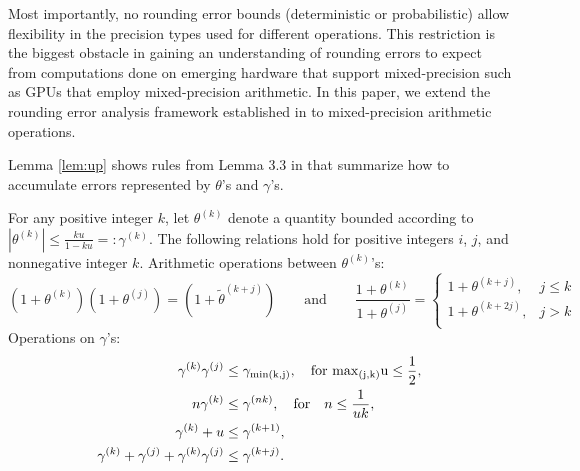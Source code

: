 \documentclass[review,onefignum,onetabnum]{siamart190516}
\newcommand{\tth}{\theta}
\begin{document}
Most importantly, no rounding error bounds (deterministic or probabilistic) allow flexibility in the precision types used for different operations. 
This restriction is the biggest obstacle in gaining an understanding of rounding errors to expect from computations done on emerging hardware that support mixed-precision such as GPUs that employ mixed-precision arithmetic.
In this paper, we extend the rounding error analysis framework established in \cite{Higham2002} to mixed-precision arithmetic operations. 




Lemma \ref{lem:up} shows rules from Lemma 3.3 in \cite{Higham2002} that summarize how to accumulate errors represented by $\tth$'s and $\gamma$'s.
\begin{lemma}
	\label{lem:up}
	For any positive integer $k$, let $\tth^{(k)}$ denote a quantity bounded according to $|\tth^{(k)}|\leq \frac{k u }{1-ku} =:\gamma^{(k)}$. The following relations hold for positive integers $i$, $j$, and nonnegative integer $k$.
	Arithmetic operations between $\tth^{(k)}$'s: 
\begin{equation}
	    (1+\tth^{(k)})(1+\tth^{(j)})%
=(1+\tilde{\tth}^{(k+j)}) %
\qquad \mbox{and} \qquad
	    \frac{1+\tth^{(k)}}{1+\tth^{(j)}} %
=
\begin{cases}
	1+\tth^{(k+j)},& j \leq k\\
	1+\tth^{(k+2j)},& j > k\\
	\end{cases} 
\end{equation}
	Operations on $\gamma$'s: 
	\begin{align*}
	\gamma^{(k)}\gamma^{(j)} &\leq \gamma_{\rm{min}(k,j)}, \quad\text{for } \rm{max}_{(j,k)} u \leq \frac{1}{2}, \\
	n\gamma^{(k)} &\leq \gamma^{(nk)}, \quad \mbox{for} \quad n \leq \frac{1}{uk},\\
	\gamma^{(k)} + u &\leq \gamma^{(k+1)}, \\ 
	\gamma^{(k)}+\gamma^{(j)}+\gamma^{(k)}\gamma^{(j)} & \leq \gamma^{(k+j)}.
	    \end{align*}
\end{lemma}
\end{document}
